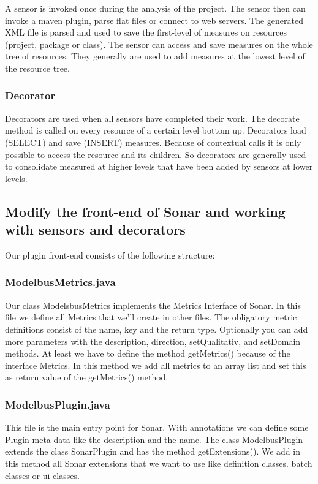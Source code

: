 A sensor is invoked once during the analysis of the project. The sensor then can invoke a maven plugin, parse flat files or connect to web servers. The generated XML file is parsed and used to save the first-level of measures on resources (project, package or class). The sensor can access and save measures on the whole tree of resources. They generally are used to add measures at the lowest level of the resource tree.

\subsubsection{Decorator}

Decorators are used when all sensors have completed their work. The decorate method is called on every resource of a certain level bottom up. Decorators load (SELECT) and save (INSERT) measures. Because of contextual calls it is only possible to access the resource and its children. So decorators are generally used to consolidate measured at higher levels that have been added by sensors at lower levels.

\subsection{Modify the front-end of Sonar and working with sensors and decorators}
Our plugin front-end consists of the following structure:

\subsubsection{ModelbusMetrics.java}

Our class ModelsbusMetrics implements the Metrics Interface of Sonar. In this file we define all Metrics that we'll create in other files. The obligatory metric definitions consist of the name, key and the return type. Optionally you can add more parameters with the description, direction, setQualitativ, and setDomain methods. At least we have to define the method getMetrics() because of the interface Metrics. In this method we add all metrics to an array list and set this as return value of the getMetrics() method.

\subsubsection{ModelbusPlugin.java}

This file is the main entry point for Sonar. With annotations we can define some Plugin meta data like the description and the name. The class ModelbusPlugin extends the class SonarPlugin and has the method getExtensions(). We add in this method all Sonar extensions that we want to use like definition classes. batch classes or ui classes.

